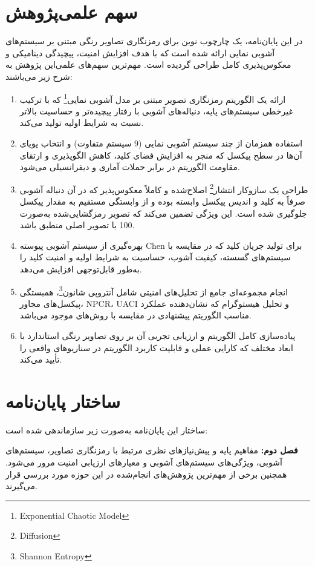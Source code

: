 \documentclass[a4paper,12pt]{report}
\renewcommand{\%}{\lr{\oldpercent}}
\providecommand{\lr}[1]{#1}
\providecommand{\LTRfootnote}[1]{\footnote{#1}}
\begin{document}
\section{سهم علمی‌پژوهش}
در این پایان‌نامه، یک چارچوب نوین برای رمزنگاری تصاویر رنگی مبتنی بر سیستم‌های آشوبی نمایی ارائه شده است که با هدف افزایش امنیت، پیچیدگی دینامیکی و معکوس‌پذیری کامل طراحی گردیده است. مهم‌ترین سهم‌های علمی‌این پژوهش به شرح زیر می‌باشند:
\begin{enumerate}
    \item ارائه یک الگوریتم رمزنگاری تصویر مبتنی بر مدل آشوبی نمایی\LTRfootnote{Exponential Chaotic Model} که با ترکیب غیرخطی سیستم‌های پایه، دنباله‌های آشوبی با رفتار پیچیده‌تر و حساسیت بالاتر نسبت به شرایط اولیه تولید می‌کند.
    \item استفاده همزمان از چند سیستم آشوبی نمایی (9 سیستم متفاوت) و انتخاب پویای آن‌ها در سطح پیکسل که منجر به افزایش فضای کلید، کاهش الگوپذیری و ارتقای مقاومت الگوریتم در برابر حملات آماری و دیفرانسیلی می‌شود.
    \item طراحی یک سازوکار انتشار\LTRfootnote{Diffusion} اصلاح‌شده و کاملاً معکوس‌پذیر که در آن دنباله آشوبی صرفاً به کلید و اندیس پیکسل وابسته بوده و از وابستگی مستقیم به مقدار پیکسل جلوگیری شده است. این ویژگی تضمین می‌کند که تصویر رمزگشایی‌شده به‌صورت \lr{100\%} با تصویر اصلی منطبق باشد.
    \item بهره‌گیری از سیستم آشوبی پیوسته \lr{Chen} برای تولید جریان کلید که در مقایسه با سیستم‌های گسسته، کیفیت آشوب، حساسیت به شرایط اولیه و امنیت کلید را به‌طور قابل‌توجهی افزایش می‌دهد.
    \item انجام مجموعه‌ای جامع از تحلیل‌های امنیتی شامل آنتروپی شانون\LTRfootnote{Shannon Entropy}، همبستگی پیکسل‌های مجاور، \lr{NPCR}، \lr{UACI} و تحلیل هیستوگرام که نشان‌دهنده عملکرد مناسب الگوریتم پیشنهادی در مقایسه با روش‌های موجود می‌باشد.
    \item پیاده‌سازی کامل الگوریتم و ارزیابی تجربی آن بر روی تصاویر رنگی استاندارد با ابعاد مختلف که کارایی عملی و قابلیت کاربرد الگوریتم در سناریوهای واقعی را تأیید می‌کند.
\end{enumerate}

\section{ساختار پایان‌نامه}
ساختار این پایان‌نامه به‌صورت زیر سازماندهی شده است:

\textbf{فصل دوم:} مفاهیم پایه و پیش‌نیازهای نظری مرتبط با رمزنگاری تصاویر، سیستم‌های آشوبی، ویژگی‌های سیستم‌های آشوبی و معیارهای ارزیابی امنیت مرور می‌شود. همچنین برخی از مهم‌ترین پژوهش‌های انجام‌شده در این حوزه مورد بررسی قرار می‌گیرند.
\end{document}
